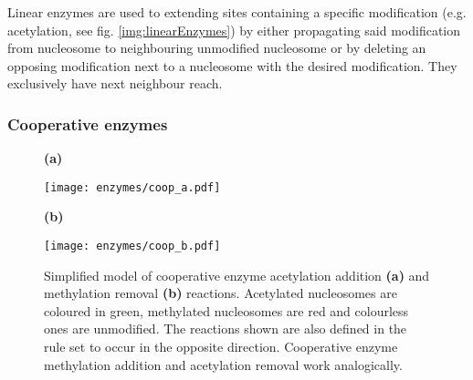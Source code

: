                 Linear enzymes are used to extending sites containing a specific modification (e.g. acetylation, see fig. \ref{img:linearEnzymes}) by either propagating said modification from nucleosome to neighbouring unmodified nucleosome or by deleting an opposing modification next to a nucleosome with the desired modification. They exclusively have next neighbour reach.
            \subsubsection*{Cooperative enzymes}
                \label{subsubsec:coopEnzymes}
                \begin{figure}[htpb!]
                    \centering
                    \begin{minipage}[t][3cm]{\textwidth}
                        \begin{minipage}{0.15\textwidth}
                            \caption*{\small \textbf{(a)}}
                        \end{minipage}
                        \begin{minipage}{0.8\textwidth}
                            \texttt{[image: enzymes/coop\_a.pdf]}
                        \end{minipage}
                    \vfill
                        \begin{minipage}{0.15\textwidth}
                            \caption*{\small \textbf{(b)}}
                        \end{minipage}
                        \begin{minipage}{0.8\textwidth}
                            \texttt{[image: enzymes/coop\_b.pdf]}
                        \end{minipage}
                    \end{minipage}
                    \caption{Simplified model of cooperative enzyme acetylation addition \textbf{(a)} and methylation removal \textbf{(b)} reactions. Acetylated nucleosomes are coloured in green, methylated nucleosomes are red and colourless ones are unmodified. The reactions shown are also defined in the rule set to occur in the opposite direction. Cooperative enzyme methylation  addition and acetylation removal work analogically.}
                    \label{img:coopEnzymes}
                \end{figure}

